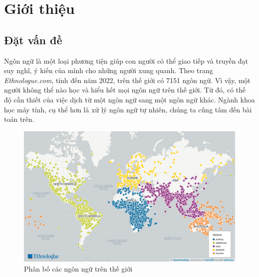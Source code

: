 \chapter{Giới thiệu}
\label{Chapter1}



\section{Đặt vấn đề}
Ngôn ngữ là một loại phương tiện giúp con người có thể giao tiếp và truyền đạt suy nghĩ, ý kiến của mình cho những người xung quanh. Theo trang \textit{Ethnologue.com}\cite{Ethnologue}, tính đến năm 2022, trên thế giới có 7151 ngôn ngữ. Vì vậy, một người không thể nào học và hiểu hết mọi ngôn ngữ trên thế giới. Từ đó, có thế độ cần thiết của việc dịch từ một ngôn ngữ sang một ngôn ngữ khác. Ngành khoa học máy tính, cụ thể hơn là xử lý ngôn ngữ tự nhiên, chúng ta cũng tâm đến bài toán trên.

\begin{figure}[H]
    \begin{center}
        \includegraphics[scale=0.4]{images/number_of_langs}
        \caption{Phân bố các ngôn ngữ trên thế giới\cite{Ethnologue}}
        \label{fig:languages_distibuttion}
    \end{center}
\end{figure}

